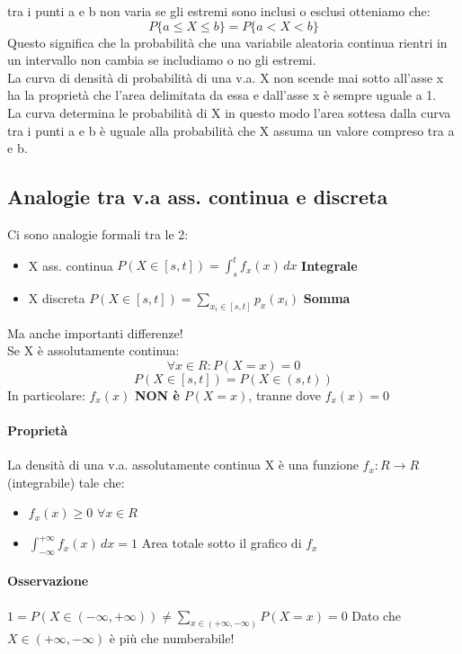 \documentclass[12pt, a4paper, openany]{book}
\begin{document}
tra i punti a e b non varia se gli estremi sono inclusi o esclusi otteniamo che:
\begin{equation*}
    P\{a \leq X \leq b\} = P\{a < X < b \}
\end{equation*}
Questo significa che la probabilità che una variabile aleatoria continua rientri in un
intervallo non cambia se includiamo o no gli estremi.
\\ La curva di densità di probabilità di una v.a. X non scende mai sotto all'asse x ha la
proprietà che l'area delimitata da essa e dall'asse x è sempre uguale a 1.
\\ La curva determina le probabilità di X in questo modo l'area sottesa dalla curva tra i punti a
e b è uguale alla probabilità che X assuma un valore compreso tra a e b.

\subsection*{Analogie tra v.a ass. continua e discreta}
Ci sono analogie formali tra le 2: \begin{itemize}
    \item X ass. continua $P(X \in [s, t]) = \int_{s}^{t} f_x (x) \,dx$ \textbf{Integrale}
    \item X discreta $P(X \in [s, t]) = \sum_{x_i \in [s,t]}p_x (x_i)$ \textbf{Somma}
\end{itemize}
Ma anche importanti differenze!
\\ Se X è assolutamente continua:
\begin{equation*}
    \forall x \in R: P(X=x) = 0
\end{equation*}
\begin{equation*}
    P(X \in [s,t]) = P(X \in (s, t))
\end{equation*}
In particolare: $f_x (x)$ \textbf{NON è} $P(X=x)$, tranne dove $f_x (x) = 0$
\paragraph*{Proprietà} La densità di una v.a. assolutamente continua X è una funzione 
$f_x : R \to R$ (integrabile) tale che: \begin{itemize}
    \item $f_x (x) \geq 0$ $\forall x \in R$
    \item $\int_{-\infty}^{+\infty} f_x (x) \,dx = 1$ Area 
    totale sotto il grafico di $f_x$
\end{itemize}
 \paragraph*{Osservazione} $1 = P(X \in (-\infty, +\infty)) 
 \neq \sum_{x \in (+\infty, -\infty)} P (X = x) = 0$ Dato che $X \in (+\infty, -\infty)$
 è più che numberabile!
 
\end{document}
